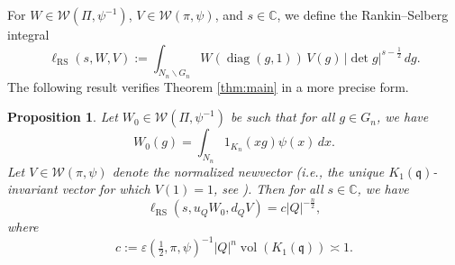 \documentclass[reqno]{amsart}
\theoremstyle{plain}
\newtheorem{proposition}[theorem]{Proposition}
\theoremstyle{definition}
\begin{document}
For $W \in \mathcal{W}(\Pi, \psi^{-1})$, $V \in \mathcal{W}(\pi, \psi)$, and $s \in \mathbb{C}$, we define the Rankin--Selberg integral
\begin{equation}\label{eq:cq4fl8vokh}
  \ell_{\mathrm{RS}}(s, W, V) := \int_{N_n \backslash G_n} W (\operatorname{diag}(g, 1)) \, V(g) \, \lvert \det g \rvert^{s - \frac{1}{2}} \, d g.
\end{equation}
The following result verifies Theorem \ref{thm:main} in a more precise form.
\begin{proposition}\label{proposition:cq4jqgikw1}
  Let $W_0 \in \mathcal{W}(\Pi, \psi^{-1})$ be such that for all $g \in G_n$, we have
  \begin{equation*}
    W_0(g) = \int_{N_n} 1_{K_n}(x g) \psi(x) \, d x.
  \end{equation*}
  Let $V \in \mathcal{W}(\pi, \psi)$ denote the normalized newvector (i.e., the unique $K_1(\mathfrak{q})$-invariant vector for which $V(1) = 1$, see \cite{MR620708, MR3138844}).  Then for all $s \in \mathbb{C}$, we have
  \begin{equation}\label{eq:cq4jqi2rfd}
    \ell_{\mathrm{RS}}(s, u_Q W_0, d_Q V) = c \lvert Q \rvert^{- \frac{n}{2}},
  \end{equation}
  where
  \begin{equation}\label{eq:cq4jqlhqy9}
    c := \varepsilon(\tfrac{1}{2}, \pi, \psi)^{-1} \lvert Q \rvert^n \operatorname{vol}(K_1(\mathfrak{q})) \asymp 1.
  \end{equation}
\end{proposition}
\end{document}
